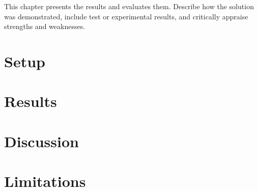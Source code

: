 %

This chapter presents the results and evaluates them. Describe how the solution was demonstrated, include test or experimental results, and critically appraise strengths and weaknesses.

\lipsum[25-26]

\section{Setup}\label{sec:setup}

\lipsum[27-28]

\section{Results}\label{sec:results}

\lipsum[29-30]

\section{Discussion}\label{sec:discussion}

\lipsum[31-32]

\section{Limitations}\label{sec:limitations}

\lipsum[33-34]
